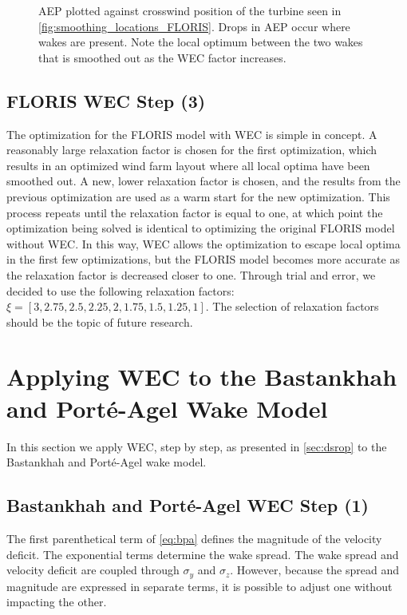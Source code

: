\documentclass[a4paper]{jpconf}
\begin{document}
\begin{figure}[ht]
\begin{minipage}[t]{0.52\textwidth}
		\caption{AEP plotted against crosswind position of the turbine seen in \cref{fig:smoothing_locations_FLORIS}. Drops in AEP occur where wakes are present. Note the local optimum between the two wakes that is smoothed out as the WEC factor increases.}
		\label{fig:FLORISLocalOptSmoothed}
	\end{minipage}
\end{figure}

\subsection{FLORIS WEC Step (3)}

The optimization for the FLORIS model with WEC is simple in concept. A reasonably large relaxation factor is chosen for the first optimization, which results in an optimized wind farm layout where all local optima have been smoothed out. A new, lower relaxation factor is chosen, and the results from the previous optimization are used as a warm start for the new optimization. This process repeats until the relaxation factor is equal to one, at which point the optimization being solved is identical to optimizing the original FLORIS model without WEC. In this way, WEC allows the optimization to escape local optima in the first few optimizations, but the FLORIS model becomes more accurate as the relaxation factor is decreased closer to one. Through trial and error, we decided to use the following relaxation factors: $\xi = [3, 2.75, 2.5, 2.25, 2, 1.75, 1.5, 1.25, 1]$. The selection of relaxation factors should be the topic of future research.

\section{Applying WEC to the Bastankhah and Port\'e-Agel Wake Model}
In this section we apply WEC, step by step, as presented in \cref{sec:dsrop} to the Bastankhah and Port\'e-Agel wake model.  

\subsection{Bastankhah and Port\'e-Agel WEC Step (1)}
The first parenthetical term of \cref{eq:bpa} defines the magnitude of the velocity deficit. The exponential terms determine the wake spread. The wake spread and velocity deficit are coupled through $\sigma_y$ and $\sigma_z$. However, because the spread and magnitude are expressed in separate terms, it is possible to adjust one without impacting the other. 
\end{document}

